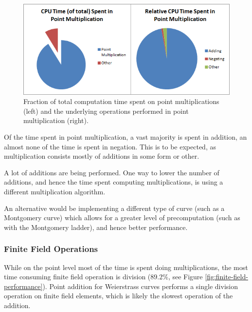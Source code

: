 \begin{figure}[htb]
	\centering
	\includegraphics[width=1\textwidth]{performance/point-multiplication--relative-time}
	\caption{Fraction of total computation time spent on point multiplications (left) and the underlying operations performed in point
		multiplication (right).}
	\label{fig:point-multiplication-performance}
\end{figure}

Of the time spent in point multiplication, a vast majority is spent in addition, an almost none of the time is spent in negation. This
is to be expected, as multiplication consists mostly of additions in some form or other.

A lot of additions are being performed. One way to lower the number of additions, and hence the time spent computing multiplications, is
using a different multiplication algorithm.

An alternative would be implementing a different type of curve (such as a Montgomery curve) which allows for a greater level of precomputation
(such as with the Montgomery ladder), and hence better performance.

\subsubsection{Finite Field Operations}
\label{sec:performance_components_finitefield}

While on the point level most of the time is spent doing multiplications, the most time consuming finite field operation is division
(\(89.2\%\), see Figure \ref{fig:finite-field-performance}). Point addition for Weierstrass curves performs a single division operation
on finite field elements, which is likely the slowest operation of the addition.


